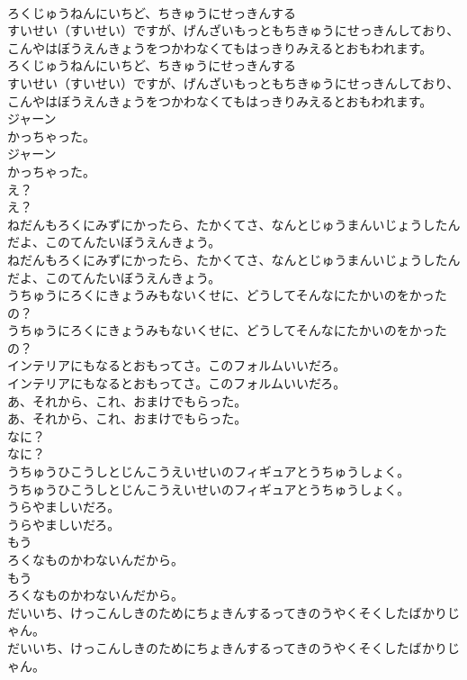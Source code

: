 \documentclass[8pt]{extreport}
\begin{document}
\begin{CJK}{UTF8}{min}
\\	ろくじゅうねんにいちど、ちきゅうにせっきんする
\\	すいせい（すいせい）ですが、げんざいもっともちきゅうにせっきんしており、こんやはぼうえんきょうをつかわなくてもはっきりみえるとおもわれます。
\\	ろくじゅうねんにいちど、ちきゅうにせっきんする
\\	すいせい（すいせい）ですが、げんざいもっともちきゅうにせっきんしており、こんやはぼうえんきょうをつかわなくてもはっきりみえるとおもわれます。
\\	ジャーン
\\	かっちゃった。
\\	ジャーン
\\	かっちゃった。
\\	え？
\\	え？
\\	ねだんもろくにみずにかったら、たかくてさ、なんとじゅうまんいじょうしたんだよ、このてんたいぼうえんきょう。
\\	ねだんもろくにみずにかったら、たかくてさ、なんとじゅうまんいじょうしたんだよ、このてんたいぼうえんきょう。
\\	うちゅうにろくにきょうみもないくせに、どうしてそんなにたかいのをかったの？
\\	うちゅうにろくにきょうみもないくせに、どうしてそんなにたかいのをかったの？
\\	インテリアにもなるとおもってさ。このフォルムいいだろ。
\\	インテリアにもなるとおもってさ。このフォルムいいだろ。
\\	あ、それから、これ、おまけでもらった。
\\	あ、それから、これ、おまけでもらった。
\\	なに？
\\	なに？
\\	うちゅうひこうしとじんこうえいせいのフィギュアとうちゅうしょく。
\\	うちゅうひこうしとじんこうえいせいのフィギュアとうちゅうしょく。
\\	うらやましいだろ。
\\	うらやましいだろ。
\\	もう
\\	ろくなものかわないんだから。
\\	もう
\\	ろくなものかわないんだから。
\\	だいいち、けっこんしきのためにちょきんするってきのうやくそくしたばかりじゃん。
\\	だいいち、けっこんしきのためにちょきんするってきのうやくそくしたばかりじゃん。

\end{CJK}
\end{document}
